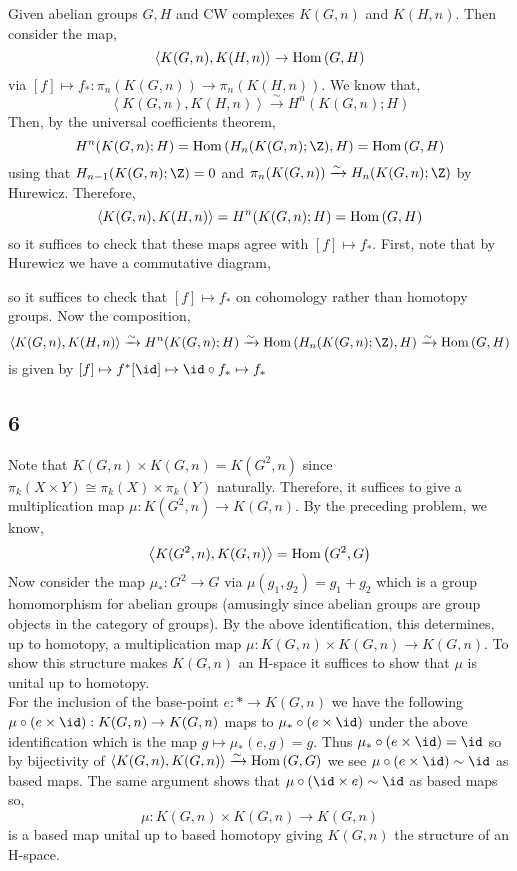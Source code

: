 \documentclass[12pt]{extarticle}
\begin{document}
Given abelian groups $G, H$ and CW complexes $K(G, n)$ and $K(H, n)$. Then consider the map,
\[ \left< K(G, n), K(H, n) \right> \to \mathrm{Hom}\left( G, H \right) \]
via $[f] \mapsto f_* : \pi_n(K(G, n)) \to \pi_n(K(H, n))$. We know that,
\[ \left< K(G, n), K(H, n) \right> \xrightarrow{\sim} H^n(K(G, n); H) \]
Then, by the universal coefficients theorem,
\[ H^n(K(G, n); H) = \Hom{H_n(K(G, n) ; \Z)}{H} = \Hom{G}{H} \]
using that $H_{n-1}(K(G, n); \Z) = 0$ and $\pi_n(K(G,n)) \xrightarrow{\sim} H_n(K(G, n); \Z)$ by Hurewicz. Therefore,
\[ \left< K(G, n), K(H, n) \right> = H^n(K(G, n); H)  = \mathrm{Hom}\left( G, H \right) \]
so it suffices to check that these maps agree with $[f] \mapsto f_*$. First, note that by Hurewicz we have a commutative diagram,
\begin{center}
\end{center}
so it suffices to check that $[f] \mapsto f_*$ on cohomology rather than homotopy groups. Now the composition,
\[ \left< K(G, n), K(H, n) \right> \xrightarrow{\sim} H^n(K(G, n); H) \xrightarrow{\sim} \Hom{H_n(K(G, n) ; \Z)}{H} \xrightarrow{\sim} \Hom{G}{H} \]
is given by $[f] \mapsto f^* [\id] \mapsto \id \circ f_* \mapsto f_*$

\subsection{6}

Note that $K(G, n) \times K(G, n) = K(G^2, n)$ since $\pi_k(X \times Y) \cong \pi_k(X) \times \pi_k(Y)$ naturally. Therefore, it suffices to give a multiplication map $\mu : K(G^2, n) \to K(G, n)$. By the preceding problem, we know,
\[ \left< K(G^2, n), K(G, n) \right> = \mathrm{Hom}\left( G^2, G \right) \]
Now consider the map $\mu_*: G^2 \to G$ via $\mu(g_1, g_2) = g_1 + g_2$ which is a group homomorphism for abelian groups (amusingly since abelian groups are group objects in the category of groups). By the above identification, this determines, up to homotopy, a multiplication map $\mu : K(G, n) \times K(G, n) \to K(G, n)$. To show this structure makes $K(G,n)$ an H-space it suffices to show that $\mu$ is unital up to homotopy. 
\bigskip\\
For the inclusion of the base-point $e : * \to K(G, n)$ we have the following $\mu \circ (e \times \id) : K(G, n) \to K(G, n)$ maps to $\mu_* \circ (e \times \id)$ under the above identification which is the map $g \mapsto \mu_*(e, g) = g$. Thus $\mu_* \circ (e \times \id) = \id$ so by bijectivity of $\left< K(G, n) , K(G, n) \right> \xrightarrow{\sim} \mathrm{Hom}\left( G, G \right)$ we see $\mu \circ (e \times \id) \sim \id$ as based maps. The same argument shows that $\mu \circ (\id \times e) \sim \id$ as based maps so,
\[ \mu : K(G, n) \times K(G, n) \to K(G, n) \]
is a based map unital up to based homotopy giving $K(G, n)$ the structure of an H-space.
\end{document}

